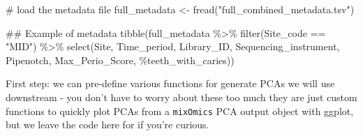 \documentclass[
  letterpaper,
]{book}
\newenvironment{Shaded}{}{}
\newcommand{\AttributeTok}[1]{\textcolor[rgb]{0.84,0.23,0.29}{#1}}
\newcommand{\CommentTok}[1]{\textcolor[rgb]{0.42,0.45,0.49}{#1}}
\newcommand{\DocumentationTok}[1]{\textcolor[rgb]{0.42,0.45,0.49}{#1}}
\newcommand{\FunctionTok}[1]{\textcolor[rgb]{0.44,0.26,0.76}{#1}}
\newcommand{\NormalTok}[1]{\textcolor[rgb]{0.14,0.16,0.18}{#1}}
\newcommand{\OtherTok}[1]{\textcolor[rgb]{0.44,0.26,0.76}{#1}}
\newcommand{\SpecialCharTok}[1]{\textcolor[rgb]{0.00,0.36,0.77}{#1}}
\newcommand{\StringTok}[1]{\textcolor[rgb]{0.01,0.18,0.38}{#1}}
\begin{document}
\begin{Shaded}
\begin{Highlighting}[]
\CommentTok{\# load the metadata file}
\NormalTok{full\_metadata }\OtherTok{\textless{}{-}} \FunctionTok{fread}\NormalTok{(}\StringTok{"full\_combined\_metadata.tsv"}\NormalTok{)}


\DocumentationTok{\#\# Example of metadata}
\FunctionTok{tibble}\NormalTok{(full\_metadata }\SpecialCharTok{\%\textgreater{}\%}
    \FunctionTok{filter}\NormalTok{(Site\_code }\SpecialCharTok{==} \StringTok{"MID"}\NormalTok{) }\SpecialCharTok{\%\textgreater{}\%}
    \FunctionTok{select}\NormalTok{(Site, Time\_period, Library\_ID, Sequencing\_instrument, Pipenotch, Max\_Perio\_Score, }\StringTok{\textasciigrave{}}\AttributeTok{\%teeth\_with\_caries}\StringTok{\textasciigrave{}}\NormalTok{))}
\end{Highlighting}
\end{Shaded}

First step: we can pre-define various functions for generate PCAs we
will use downstream - you don't have to worry about these too much they
are just custom functions to quickly plot PCAs from a \texttt{mixOmics}
PCA output object with ggplot, but we leave the code here for if you're
curious.
\end{document}
